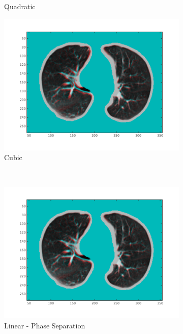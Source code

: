 \documentclass[11pt,a4paper,oneside]{report}
\begin{document}
\begin{figure}[H]
\begin{subfigure}[b]{0.33\textwidth}
    \caption{Quadratic}
  \end{subfigure}
  \begin{subfigure}[b]{0.33\textwidth}
    \includegraphics[width=\textwidth, trim=0 50 0 0,clip=true]{figures/task4/visAss_m3.png}
    \caption{Cubic}
  \end{subfigure}
  ~
  \hspace*{-2em}
  \begin{subfigure}[b]{0.33\textwidth}
    \includegraphics[width=\textwidth, trim=0 50 0 0,clip=true]{figures/task4/visAss_m1.png}
    \caption{Linear - Phase Separation}
  \end{subfigure}%
  \begin{subfigure}[b]{0.33\textwidth}

\end{subfigure}
\end{figure}
\end{document}
